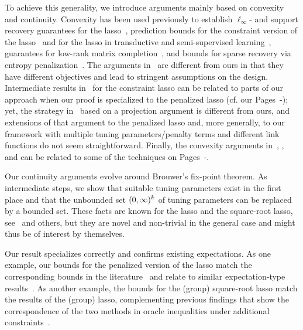 \documentclass[bj]{imsart}
\newcommand{\1}{{\rm 1}\mskip -4,5mu{\rm l} }
\begin{document}
To achieve this generality, we introduce arguments mainly based on convexity and continuity. \label{convexityintro} Convexity has been used previously to establish $\ell_\infty$- and support recovery guarantees for the lasso~\cite{Wainwright09}, prediction bounds for the constraint version of the lasso~\cite{Chatterjee13} and for the lasso in transductive and semi-supervised learning~\cite{Bellec16b},  guarantees for low-rank matrix completion~\cite{Kolt10}, and bounds for sparse recovery via entropy penalization~\cite{Koltchinskii09c}. The arguments  in~\cite{Wainwright09} are different from ours in that they have different objectives and lead to stringent assumptions on the design. Intermediate results in~\cite[Page~6]{Chatterjee13} for the constraint lasso can be related to parts of our approach when our proof is specialized to the penalized lasso (cf. our Pages~\pageref{page:argument}-\pageref{page:last}); yet, the strategy in~\cite{Chatterjee13} based on a projection argument is different from ours, and extensions of that argument to the penalized lasso and, more generally, to our framework with multiple tuning parameters/penalty terms and different link functions do not seem straightforward. 
Finally, the convexity arguments in~\cite[Proof of Lemma~1]{Bellec16b}, \cite[Equation~(2.6)]{Kolt10}, and \cite[Inequalities~(3.1) and~(3.2)]{Koltchinskii09c} can be related to some of the techniques on Pages~\pageref{page:argument}-\pageref{page:last}.

Our continuity arguments evolve around Brouwer's fix-point theorem. As intermediate steps, we show that suitable tuning parameters exist in the first place and that the unbounded set $(0,\infty)^{k}$ of tuning parameters can be replaced by a bounded set. These facts are known for the lasso and the square-root lasso, see~\cite{Belloni11} and others, but they are novel and non-trivial in the general case and might thus be of interest by themselves.

Our result specializes correctly and confirms existing expectations.
As one example, our bounds for the penalized version of the lasso match the corresponding bounds in the literature~\cite{Kolt10,RigTsy11} and relate to similar expectation-type results~\cite{MM11}.
As another example, the bounds for the (group) square-root lasso match the results of the (group) lasso, complementing previous findings that show the correspondence of the two methods in oracle inequalities under additional constraints~\cite{Belloni11,Yoyo13}.
\end{document}
